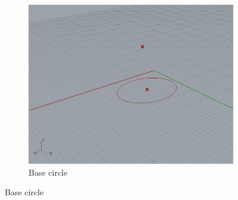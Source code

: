 \documentclass[preprint,12pt,3p]{elsarticle}
\begin{document}
\begin{figure}
\begin{subfigure}{0.3\textwidth}
  \centering
  \includegraphics[width=.9\linewidth]{a02s03.png}
  \caption{Base circle}
  \label{fig:a02s03}
\end{subfigure}



\end{figure}
\end{document}
